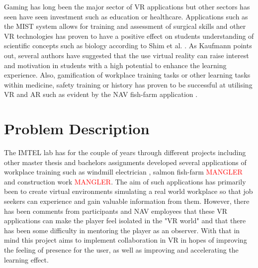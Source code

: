 Gaming has long been the major sector of VR applications but other sectors has seen have seen investment such as education or healthcare. Applications such as the MIST system \cite{mccloy2001virtual} allows for training and assessment of surgical skills and other VR technologies has proven to have a positive effect on students understanding of scientific concepts such as biology according to Shim et al. \cite{shim2003application}. As Kaufmann \cite{kaufmann2003collaborative} points out, several authors have suggested that the use virtual reality can raise interest and motivation in students with a high potential to enhance the learning experience.
Also, gamification of workplace training tasks or other learning tasks within medicine, safety training or history has proven to be successful at utilising VR and AR such as evident by the NAV fish-farm application \cite{fishfarmNAV}.












%

\section{Problem Description}
The IMTEL lab has for the couple of years through different projects including other master thesis and bachelors assignments developed several applications of workplace training such as windmill electrician \cite{henrichsen2019engaging}, salmon fish-farm \cite{} \textcolor{red}{MANGLER} and construction work \cite{}  \textcolor{red}{MANGLER}. The aim of such applications has primarily been to create virtual environments simulating a real world workplace so that job seekers can experience and gain valuable information from them.
However, there has been comments from participants and NAV employees that these VR applications can make the player feel isolated in the "VR world" and that there has been some difficulty in mentoring the player as an observer. With that in mind this project aims to implement collaboration in VR in hopes of improving the feeling of presence for the user, as well as improving and accelerating the learning effect. 


